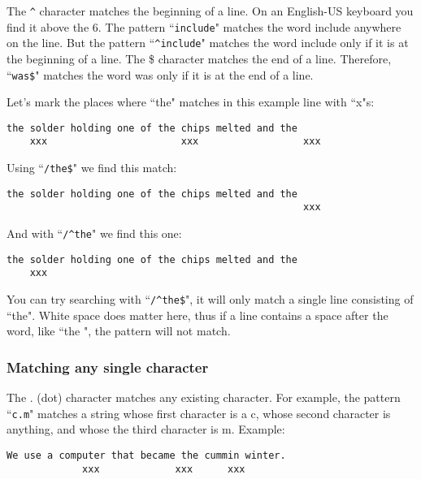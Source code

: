 The \texttt{\^{}} character matches the beginning of a line.
On an English-US keyboard you find it above the 6.
The pattern ``\texttt{include}" matches the word include anywhere on the line.
But the pattern ``\texttt{\^{}include}" matches the word include only if it is at the beginning of a line.
The \$ character matches the end of a line.
Therefore, ``\texttt{was\$}" matches the word was only if it is at the end of a line.

Let's mark the places where ``the" matches in this example line with ``x"s:

		\begin{Verbatim}[samepage=true]
    the solder holding one of the chips melted and the
    xxx                       xxx                  xxx
		\end{Verbatim}

Using ``\texttt{/the\$}" we find this match:

		\begin{Verbatim}[samepage=true]
    the solder holding one of the chips melted and the
                                                   xxx
		\end{Verbatim}

And with ``\texttt{/\^{}the}" we find this one:

		\begin{Verbatim}[samepage=true]
    the solder holding one of the chips melted and the
    xxx
		\end{Verbatim}

You can try searching with ``\texttt{/\^{}the\$}", it will only match a single line consisting of ``the".
White space does matter here, thus if a line contains a space after the word, like ``the ", the pattern will not match.

\subsubsection{Matching any single character}

The . (dot) character matches any existing character.
For example, the pattern ``\texttt{c.m}" matches a string whose first character is a c, whose second character is anything, and whose the third character is m.
Example:

		\begin{Verbatim}[samepage=true]
    We use a computer that became the cummin winter.
             xxx             xxx      xxx
		\end{Verbatim}


